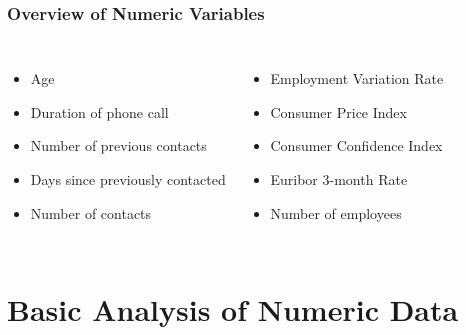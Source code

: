 \documentclass{beamer}
\begin{document}
\begin{frame}
	\frametitle{Overview of Numeric Variables}
  \begin{columns}[c]
	\begin{itemize}
		\item Age
		\newline
		\item Duration of phone call
		\newline
		\item Number of previous contacts
		\newline
		\item Days since previously contacted
		\newline
		\item Number of contacts
		\newline
	\end{itemize}

	\begin{itemize}
		\item Employment Variation Rate
		\newline
		\item Consumer Price Index
		\newline
		\item Consumer Confidence Index
		\newline
		\item Euribor 3-month Rate
		\newline
		\item Number of employees
		\newline
	\end{itemize}
  \end{columns}
\end{frame}

\section{Basic Analysis of Numeric Data} %
\end{document}
